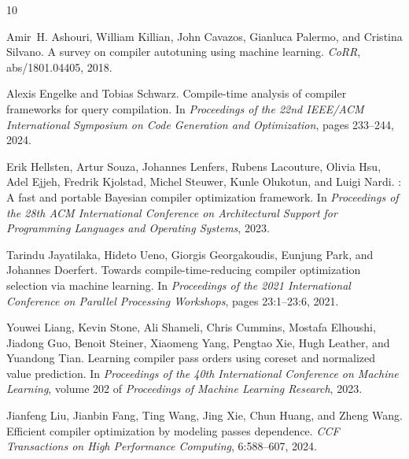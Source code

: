 \documentclass{article}
\begin{document}
\begin{thebibliography}{10}

Amir~H. Ashouri, William Killian, John Cavazos, Gianluca Palermo, and
Cristina Silvano.
\newblock A survey on compiler autotuning using machine learning.
\newblock \emph{CoRR}, abs/1801.04405, 2018.

Alexis Engelke and Tobias Schwarz.
\newblock Compile-time analysis of compiler frameworks for query compilation.
\newblock In \emph{Proceedings of the 22nd IEEE/ACM International Symposium on
Code Generation and Optimization}, pages 233--244, 2024.

Erik Hellsten, Artur Souza, Johannes Lenfers, Rubens Lacouture, Olivia Hsu,
Adel Ejjeh, Fredrik Kjolstad, Michel Steuwer, Kunle Olukotun, and Luigi Nardi.
: A fast and portable {B}ayesian compiler optimization
framework.
\newblock In \emph{Proceedings of the 28th ACM International Conference on
Architectural Support for Programming Languages and Operating Systems}, 2023.

Tarindu Jayatilaka, Hideto Ueno, Giorgis Georgakoudis, Eunjung Park, and
Johannes Doerfert.
\newblock Towards compile-time-reducing compiler optimization selection via
machine learning.
\newblock In \emph{Proceedings of the 2021 International Conference on Parallel
Processing Workshops}, pages 23:1--23:6, 2021.

Youwei Liang, Kevin Stone, Ali Shameli, Chris Cummins, Mostafa Elhoushi,
Jiadong Guo, Benoit Steiner, Xiaomeng Yang, Pengtao Xie, Hugh Leather, and
Yuandong Tian.
\newblock Learning compiler pass orders using coreset and normalized value
prediction.
\newblock In \emph{Proceedings of the 40th International Conference on Machine
Learning}, volume 202 of \emph{Proceedings of Machine Learning Research},
2023.

Jianfeng Liu, Jianbin Fang, Ting Wang, Jing Xie, Chun Huang, and Zheng Wang.
\newblock Efficient compiler optimization by modeling passes dependence.
\newblock \emph{CCF Transactions on High Performance Computing}, 6:588--607,
2024.


\end{thebibliography}
\end{document}
